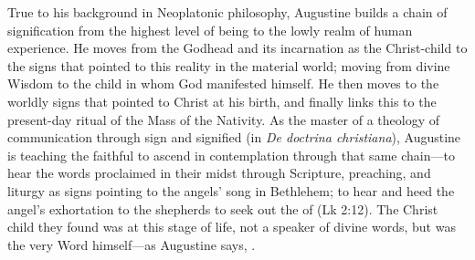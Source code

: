 \noindent
True to his background in Neoplatonic philosophy, Augustine builds a chain of
signification from the highest level of being to the lowly realm of human
experience.
He moves from the Godhead and its incarnation as the Christ-child to the signs
that pointed to this reality in the material world;
moving from divine Wisdom to the child in whom God manifested himself.
He then moves to the worldly signs that pointed to Christ at his birth, and
finally links this to the present-day ritual of the Mass of the Nativity.
As the master of a theology of communication through sign and signified (in
\emph{De
doctrina christiana}), Augustine is teaching the faithful to ascend in
contemplation through that same chain---to hear the words proclaimed in their
midst through Scripture, preaching, and liturgy as signs pointing to the angels'
song in Bethlehem; to hear and heed the angel's exhortation to the shepherds to
seek out the  of  (Lk 2:12).
The Christ child they found was at this  stage of life, not a speaker of
divine words, but was the very Word himself---as Augustine says, .

